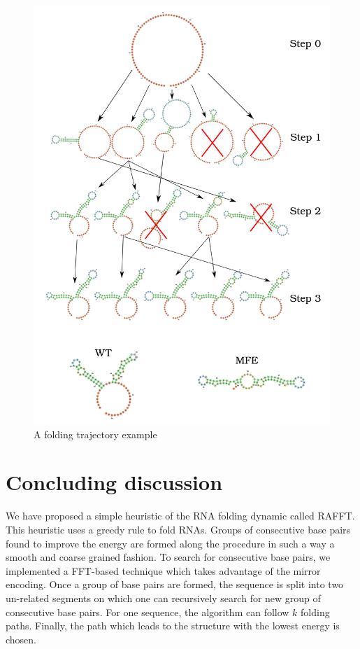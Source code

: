 \documentclass[a4paper,12pt]{article}
\begin{document}
{{\begin{figure}[htbp]
\centering
\includegraphics[width=.9\linewidth]{img/comb_frame_shift.png}
\caption{A folding trajectory example}
\end{figure}

\section{Concluding discussion}
\label{sec:orgccf874b}
We have proposed a simple heuristic of the RNA folding dynamic called RAFFT.
This heuristic uses a greedy rule to fold RNAs. Groups of consecutive base pairs
found to improve the energy are formed along the procedure in such a way a
smooth and coarse grained fashion. To search for consecutive base pairs, we
implemented a FFT-based technique which takes advantage of the mirror encoding.
Once a group of base pairs are formed, the sequence is split into two un-related
segments on which one can recursively search for new group of consecutive base
pairs. For one sequence, the algorithm can follow \(k\) folding paths. Finally,
the path which leads to the structure with the lowest energy is chosen.


}}
\end{document}
